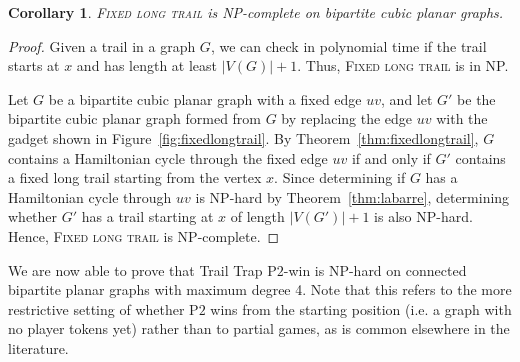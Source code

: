 \documentclass{article}
\theoremstyle{plain}
\newtheorem{corollary}[theorem]{Corollary}
\theoremstyle{definition}
\newcommand{\stephen}[1]{{\color{red!80!black}\textsc{Stephen:} #1}}
\def\ptwo{{\rm{P}\ensuremath{2}}}
\begin{document}
    


\begin{corollary}
    \label{cor:npc-trail-cubic-fixed-start}
    \textsc{Fixed long trail} is NP-complete on bipartite cubic planar graphs.
\end{corollary}

\begin{proof}
  Given a trail in a graph $G$, we can check in polynomial time if the trail starts at $x$ and has length at least $|V(G)|+1$. Thus, \textsc{Fixed long trail} is in NP.

  Let $G$ be a bipartite cubic planar graph with a fixed edge $uv$, and let $G'$ be the bipartite cubic planar graph formed from $G$ by replacing the edge $uv$ with the gadget shown in Figure~\ref{fig:fixedlongtrail}.
  By Theorem~\ref{thm:fixedlongtrail}, $G$ contains a Hamiltonian cycle through the fixed edge $uv$ if and only if $G'$ contains a fixed long trail starting from the vertex $x$.
  Since determining if $G$ has a Hamiltonian cycle through $uv$ is NP-hard by Theorem~\ref{thm:labarre}, determining whether $G'$ has a trail starting at $x$ of length $|V(G')|+1$ is also NP-hard.
  Hence, \textsc{Fixed long trail} is NP-complete.
\end{proof}

We are now able to prove that {\sc Trail Trap \ptwo{}-win} is NP-hard on connected bipartite planar graphs with maximum degree 4. Note that this refers to the more restrictive setting of whether \ptwo{} wins from the starting position (i.e. a graph with no player tokens yet) rather than to partial games, as is common elsewhere in the literature.
\end{document}

